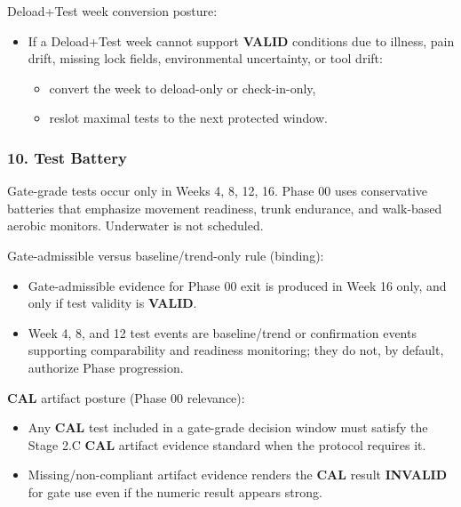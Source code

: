\documentclass[10pt]{article}
\begin{document}
Deload+Test week conversion posture:

\begin{itemize}
\item If a Deload+Test week cannot support \textbf{VALID} conditions due to illness, pain drift, missing lock fields, environmental uncertainty, or tool drift:
  \begin{itemize}
  \item convert the week to deload-only or check-in-only,
  \item reslot maximal tests to the next protected window.
  \end{itemize}
\end{itemize}

\newpage
\subsubsection*{10. Test Battery}

Gate-grade tests occur only in Weeks 4, 8, 12, 16. Phase 00 uses conservative batteries that emphasize movement readiness, trunk endurance, and walk-based aerobic monitors. Underwater is not scheduled.

Gate-admissible versus baseline/trend-only rule (binding):

\begin{itemize}
\item Gate-admissible evidence for Phase 00 exit is produced in Week 16 only, and only if test validity is \textbf{VALID}.
\item Week 4, 8, and 12 test events are baseline/trend or confirmation events supporting comparability and readiness monitoring; they do not, by default, authorize Phase progression.
\end{itemize}

\textbf{CAL} artifact posture (Phase 00 relevance):

\begin{itemize}
\item Any \textbf{CAL} test included in a gate-grade decision window must satisfy the Stage 2.C \textbf{CAL} artifact evidence standard when the protocol requires it.
\item Missing/non-compliant artifact evidence renders the \textbf{CAL} result \textbf{INVALID} for gate use even if the numeric result appears strong.
\end{itemize}
\end{document}
